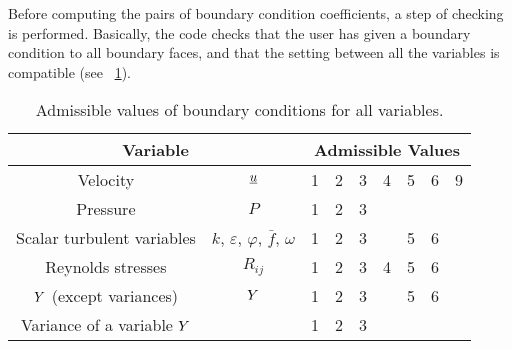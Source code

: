  Before computing the pairs of boundary condition coefficients, a step of checking is performed. Basically,
the code checks that the user has given a boundary condition to all boundary faces, and that
the setting between all the variables is compatible (see \tablename~\ref{tab:ICODCLadm_condli}).



\begin{table}
\begin{center}
\begin{tabular}{||c|c||p{}|p{}|p{}|p{}|p{}|p{}|p{}||}
\hline
\multicolumn{2}{||c||}{Variable}
        &\multicolumn{7}{c||}{Admissible Values}\\
\hline
Velocity                                & $\underline{u}$                                                                         &  1& 2& 3& 4& 5& 6& 9 \\
Pressure                                & $P$                                                                                   &  1& 2& 3&  &  & & \\
Scalar turbulent variables     & $k$, $\varepsilon$, $\varphi$, $\bar{f}$, $\omega$        &  1& 2& 3&  & 5& 6& \\
Reynolds stresses                & $R_{ij}$                                                                              &  1& 2& 3& 4& 5& 6& \\
$Y$ (except variances)  &  $Y$                                                                           &  1& 2& 3&  & 5& 6& \\
Variance of a variable $Y$ &                                                                                      &  1& 2& 3&  &  & & \\
\hline
\end{tabular}
\end{center}
\caption{Admissible values of boundary conditions for all variables.}\label{tab:ICODCLadm_condli}
\end{table}


